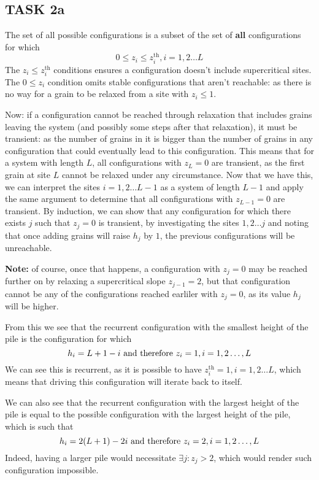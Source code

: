\documentclass[a4paper,12pt]{article}
\begin{document}
\subsection{TASK 2a}

The set of all possible configurations is a subset of the set of \textbf{all} configurations for which
$$0\leq z_i\leq z_i^{\mathrm{th}}, i=1, 2 \dots L$$
The $z_i\leq z_i^{\mathrm{th}}$ conditions ensures a configuration doesn't include supercritical sites. The $0\leq z_i$ condition omits stable configurations that aren't reachable: as there is no way for a grain to be relaxed from a site with $z_i\leq 1$.

Now: if a configuration cannot be reached through relaxation that includes grains leaving the system (and possibly some steps after that relaxation), it must be transient: as the number of grains in it is bigger than the number of grains in any configuration that could eventually lead to this configuration. This means that for a system with length $L$, all configurations with $z_L = 0$ are transient, as the first grain at site $L$ cannot be relaxed under any circumstance. Now that we have this, we can interpret the sites $i=1, 2\dots L-1$ as a system of length $L-1$ and apply the same argument to determine that all configurations with $z_{L-1} = 0$ are transient. By induction, we can show that any configuration for which there exists $j$ such that $z_j=0$ is transient, by investigating the sites $1, 2\dots j$ and noting that once adding grains will raise $h_j$ by $1$, the previous configurations will be unreachable.

\textbf{Note:} of course, once that happens, a configuration with $z_j=0$ may be reached further on by relaxing a supercritical slope $z_{j-1}=2$, but that configuration cannot be any of the configurations reached earliler with $z_j=0$, as its value $h_j$ will be higher.

From this we see that the recurrent configuration with the smallest height of the pile is the configuration for which
$$h_i=L+1-i\hbox{ and therefore }z_i=1, i = 1, 2\dots, L$$
We can see this is recurrent, as it is possible to have $z_i^\mathrm{th}=1, i=1, 2\dots L$, which means that driving this configuration will iterate back to itself.

We can also see that the recurrent configuration with the largest height of the pile is equal to the possible configuration with the largest height of the pile, which is such that
$$h_i=2(L+1)-2i\hbox{ and therefore }z_i=2, i = 1, 2\dots, L$$
Indeed, having a larger pile would necessitate $\exists j:z_j>2$, which would render such configuration impossible.
\end{document}
